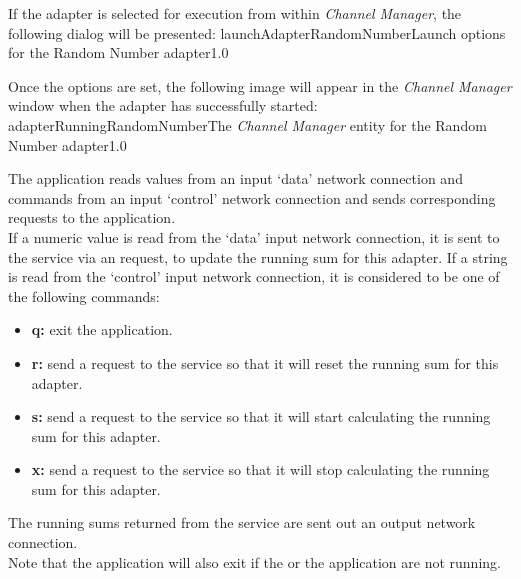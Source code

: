 If the adapter is selected for execution from within \emph{Channel Manager}, the following
dialog will be presented:
%
{launchAdapterRandomNumber}{Launch options for the Random Number adapter}{1.0}

Once the options are set, the following image will appear in the \emph{Channel Manager}
window when the adapter has successfully started:
%
{adapterRunningRandomNumber}{The \emph{Channel Manager} entity for the Random Number
adapter}{1.0}

The  application reads  values from an input
`data' \yarp{} network connection and commands from an input `control' \yarp{} network
connection and sends corresponding requests to the
 application.\\

If a numeric value is read from the `data' input \yarp{} network connection, it is sent to
the service via an  request, to update the
running sum for this adapter.
If a string is read from the `control' input \yarp{} network connection, it is considered
to be one of the following commands:
\begin{itemize}
\item\textbf{q:} exit the application.
\item\exSp\textbf{r:} send a  request to the
service so that it will reset the running sum for this adapter.
\item\exSp\textbf{s:} send a  request to the
service so that it will start calculating the running sum for this adapter.
\item\exSp\textbf{x:} send a  request to the
service so that it will stop calculating the running sum for this adapter.
\end{itemize}
The running sums returned from the service are sent out an output \yarp{} network
connection.\\

Note that the application will also exit if the
 or the
 application are not running.\\


